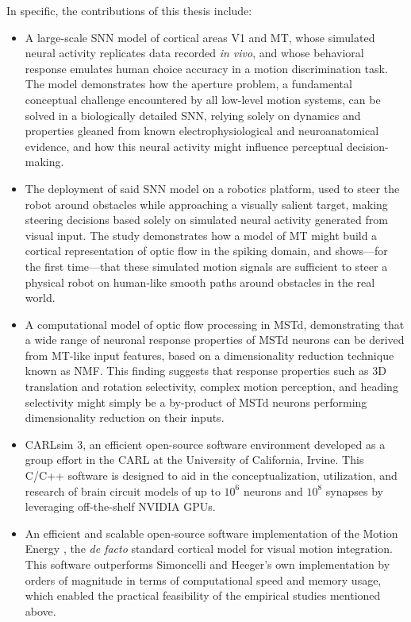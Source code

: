 In specific, the contributions of this thesis include:
\begin{itemize}
\item A large-scale \ac{SNN} model of cortical areas \ac{V1} and \ac{MT}, 
    whose simulated neural activity replicates data recorded \emph{in vivo},
    and whose behavioral response emulates human choice accuracy 
    in a motion discrimination task.
	The model demonstrates how the aperture problem, a fundamental conceptual
    challenge encountered by all low-level motion systems, can be
	solved in a biologically detailed \ac{SNN},
	relying solely on dynamics and properties 
    gleaned from known electrophysiological and neuroanatomical evidence,
    and how this neural activity might influence perceptual decision-making.
    
\item The deployment of said \ac{SNN} model on a robotics platform, used to steer
	the robot around obstacles while approaching a visually salient target,
    making steering decisions based solely on
    simulated neural activity generated from visual input.
    The study demonstrates how a model of \ac{MT} might build a 
    cortical representation of optic flow in the spiking domain, 
    and shows---for the first time---that
    these simulated motion signals are sufficient to steer a physical robot on
    human-like smooth paths around obstacles in the real world.

\item A computational model of optic flow processing in \acf{MSTd}, 
	demonstrating that a wide range of neuronal response properties of \ac{MSTd}
    neurons can be derived from \ac{MT}-like input features,
    based on a dimensionality reduction technique known as \acf{NMF}.
    This finding suggests that response properties such as 3D translation and
    rotation selectivity, complex motion perception, and heading selectivity
    might simply be a by-product of \ac{MSTd} neurons performing dimensionality
    reduction on their inputs.
    
\item CARLsim 3, an efficient open-source software environment developed as a group
	effort in the \ac{CARL} at the University of California, Irvine. 
    This C/C++ software is designed to aid in the conceptualization, utilization, 
    and research of brain circuit
    models of up to $10^6$ neurons and $10^8$ synapses by leveraging 
    off-the-shelf NVIDIA \acp{GPU}.
    
\item An efficient and scalable open-source software implementation of the
	Motion Energy \citep{SimoncelliHeeger1998}, the \emph{de facto}
    standard cortical model for visual motion integration.
    This software outperforms Simoncelli and Heeger's own implementation by
    orders of magnitude in terms of computational speed and memory usage,
    which enabled the practical feasibility of the empirical studies mentioned above.
\end{itemize}

